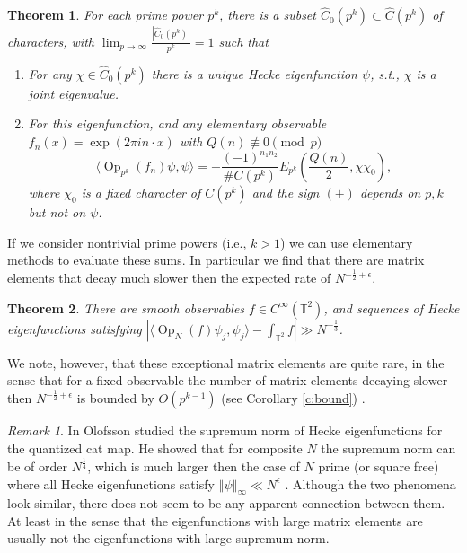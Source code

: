 \documentclass[12pt]{amsart}
\newtheorem{thm}{Theorem}%
\theoremstyle{definition}
\theoremstyle{remark}
\newtheorem{rem}{Remark}[section]
\numberwithin{equation}{section}
\newcommand{\norm}[1]{\left\Vert#1\right\Vert}
\newcommand{\bbT}{\mathbb{T}}
\newcommand{\Op}{ \operatorname{Op}}
\begin{document}
\begin{thm}\label{t:form1}
For each prime power $p^k$, there is a subset $\hat C_0(p^k)\subset
\hat{C}(p^k)$ of characters, with $\lim_{p\to\infty}\frac{|\hat
C_0(p^k)|}{p^k}=1$ such that
\begin{enumerate}
\item For any $\chi\in \hat C_0(p^k)$ there is a unique Hecke eigenfunction $\psi$, s.t., $\chi$ is a joint eigenvalue.
\item For this eigenfunction, and any elementary observable $f_n(x)=\exp(2\pi i n\cdot x)$ with $Q(n)\not\equiv 0\pmod{p}$
\[\langle\Op_{p^k}(f_n)\psi,\psi\rangle=\pm\frac{(-1)^{n_1n_2}}{\# C(p^k)}E_{p^k}(\frac{Q(n)}{2},\chi\chi_0),\]
where $\chi_0$ is a fixed character of $C(p^k)$ and the sign $(\pm)$
depends on $p,k$ but not on $\psi$.
\end{enumerate}
\end{thm}

If we consider nontrivial prime powers (i.e., $k>1$) we can use
elementary methods to evaluate these sums. In particular we find
that there are matrix elements that decay much slower then the
expected rate of $N^{-\frac{1}{2}+\epsilon}$.
\begin{thm}\label{t:slowdecay}
There are smooth observables $f\in C^\infty(\bbT^2)$, and sequences
of Hecke eigenfunctions satisfying
$|\langle\Op_N(f)\psi_j,\psi_j\rangle-\int_{\bbT^2} f|\gg
N^{-\frac{1}{3}}$.
\end{thm}

We note, however, that these exceptional matrix elements are quite
rare, in the sense that for a fixed observable the number of matrix
elements decaying slower then $N^{-\frac{1}{2}+\epsilon}$ is bounded
by $O(p^{k-1})$ (see Corollary \ref{c:bound}) .


\begin{rem}
In \cite{Olofsson07}  Olofsson studied the supremum norm of Hecke
eigenfunctions for the quantized cat map. He showed that for
composite $N$ the supremum norm can be of order $N^{\frac{1}{4}}$,
which is much larger then the case of $N$ prime (or square free)
where all Hecke eigenfunctions satisfy $\norm{\psi}_\infty\ll
N^\epsilon$ \cite{GurevichHadanisup05,Kurlberg07}. Although the two
phenomena look similar, there does not seem to be any apparent
connection between them. At least in the sense that the
eigenfunctions with large matrix elements are usually not the
eigenfunctions with large supremum norm.
\end{rem}
\end{document}
